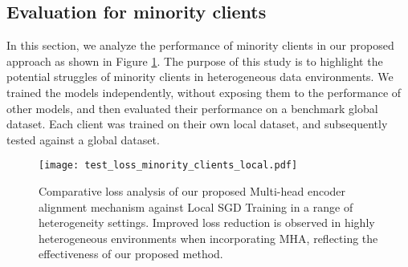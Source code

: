 \subsection{Evaluation for minority clients}

In this section, we analyze the performance of minority clients in our proposed approach as shown in Figure \ref{fig:minority_performance}. The purpose of this
study is to highlight the potential struggles of minority clients in heterogeneous data environments. We trained the models independently, without exposing them to the performance of other models, and then evaluated their performance on a benchmark global dataset. Each client was trained on their own local dataset, and subsequently tested against a global dataset.

\begin{figure}[htbp]
    \centering
    \texttt{[image: test\_loss\_minority\_clients\_local.pdf]}
    \caption{ Comparative loss analysis of our proposed Multi-head encoder alignment mechanism against Local SGD Training in a range of heterogeneity settings. Improved loss reduction is observed in highly heterogeneous environments when incorporating MHA, reflecting the effectiveness of our proposed method.}
    \label{fig:minority_performance}
\end{figure}



